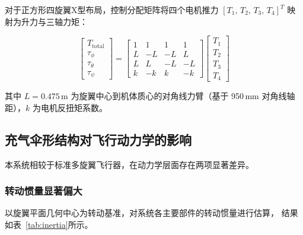 对于正方形四旋翼X型布局，控制分配矩阵将四个电机推力
$[T_1,\,T_2,\,T_3,\,T_4]^T$ 映射为升力与三轴力矩：

\begin{equation}
    \begin{bmatrix} T_{\text{total}} \\ \tau_\phi \\ \tau_\theta \\ \tau_\psi \end{bmatrix}
    =
    \begin{bmatrix}
        1 &  1 &  1 &  1 \\
        L & -L & -L &  L \\
        L &  L & -L & -L \\
        k & -k &  k & -k
    \end{bmatrix}
    \begin{bmatrix} T_1 \\ T_2 \\ T_3 \\ T_4 \end{bmatrix}
    \label{eq:allocation}
\end{equation}

其中 $L = 0.475$\,m 为旋翼中心到机体质心的对角线力臂（基于 950\,mm 对角线轴距），$k$ 为电机反扭矩系数。


\subsection{充气伞形结构对飞行动力学的影响}

本系统相较于标准多旋翼飞行器，在动力学层面存在两项显著差异。

\subsubsection{转动惯量显著偏大}
以旋翼平面几何中心为转动基准，对系统各主要部件的转动惯量进行估算，
结果如表~\ref{tab:inertia}所示。

